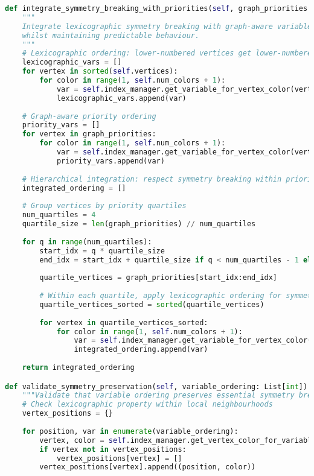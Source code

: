 \begin{lstlisting}[language=Python, caption=Symmetry Breaking Integration with Graph-Aware Ordering]
def integrate_symmetry_breaking_with_priorities(self, graph_priorities: List[int]) -> List[int]:
    """
    Integrate lexicographic symmetry breaking with graph-aware variable ordering
    whilst maintaining predictable behaviour.
    """
    # Lexicographic ordering: lower-numbered vertices get lower-numbered colours first
    lexicographic_vars = []
    for vertex in sorted(self.vertices):
        for color in range(1, self.num_colors + 1):
            var = self.index_manager.get_variable_for_vertex_color(vertex, color)
            lexicographic_vars.append(var)
    
    # Graph-aware priority ordering
    priority_vars = []
    for vertex in graph_priorities:
        for color in range(1, self.num_colors + 1):
            var = self.index_manager.get_variable_for_vertex_color(vertex, color)
            priority_vars.append(var)
    
    # Hierarchical integration: respect symmetry breaking within priority groups
    integrated_ordering = []
    
    # Group vertices by priority quartiles
    num_quartiles = 4
    quartile_size = len(graph_priorities) // num_quartiles
    
    for q in range(num_quartiles):
        start_idx = q * quartile_size
        end_idx = start_idx + quartile_size if q < num_quartiles - 1 else len(graph_priorities)
        
        quartile_vertices = graph_priorities[start_idx:end_idx]
        
        # Within each quartile, apply lexicographic ordering for symmetry breaking
        quartile_vertices_sorted = sorted(quartile_vertices)
        
        for vertex in quartile_vertices_sorted:
            for color in range(1, self.num_colors + 1):
                var = self.index_manager.get_variable_for_vertex_color(vertex, color)
                integrated_ordering.append(var)
    
    return integrated_ordering

def validate_symmetry_preservation(self, variable_ordering: List[int]) -> bool:
    """Validate that variable ordering preserves essential symmetry breaking properties"""
    # Check lexicographic property within local neighbourhoods
    vertex_positions = {}
    
    for position, var in enumerate(variable_ordering):
        vertex, color = self.index_manager.get_vertex_color_for_variable(var)
        if vertex not in vertex_positions:
            vertex_positions[vertex] = []
        vertex_positions[vertex].append((position, color))
    

\end{lstlisting}
